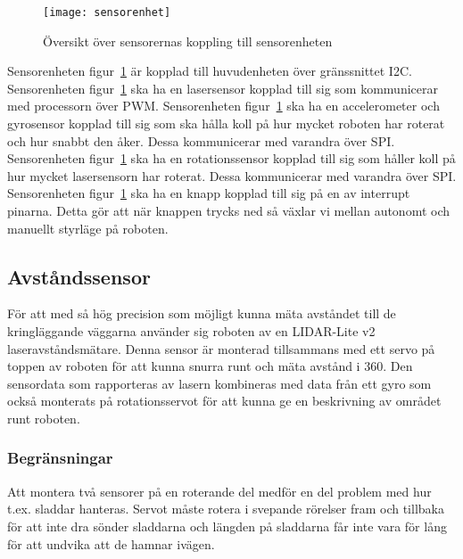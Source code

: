 \documentclass{article}
\begin{document}
\begin{figure}[H]
\centering
\texttt{[image: sensorenhet]}
\caption{Översikt över sensorernas koppling till sensorenheten}
\label{fig:sensorenhet}
\end{figure}
Sensorenheten figur~\ref{fig:sensorenhet} är kopplad till huvudenheten över gränssnittet I2C.\newline\newline
Sensorenheten figur~\ref{fig:sensorenhet} ska ha en lasersensor kopplad till sig som kommunicerar med processorn över PWM.\newline\newline
Sensorenheten figur~\ref{fig:sensorenhet} ska ha en accelerometer och gyrosensor kopplad till sig som ska hålla koll på hur mycket roboten har roterat och hur snabbt den åker. Dessa kommunicerar med varandra över SPI. \newline\newline
Sensorenheten figur~\ref{fig:sensorenhet} ska ha en rotationssensor kopplad till sig som håller koll på hur mycket lasersensorn har roterat. Dessa kommunicerar med varandra över SPI. \newline\newline
Sensorenheten figur~\ref{fig:sensorenhet} ska ha en knapp kopplad till sig på en av interrupt pinarna. Detta gör att när knappen trycks ned så växlar vi mellan autonomt och manuellt styrläge på roboten. \newline\newline

\subsection{Avståndssensor}
För att med så hög precision som möjligt kunna mäta avståndet till de kringläggande väggarna använder sig roboten av en LIDAR-Lite v2 laseravståndsmätare. Denna sensor är monterad tillsammans med ett servo på toppen av roboten för att kunna snurra runt och mäta avstånd i 360\textdegree. Den sensordata som rapporteras av lasern kombineras med data från ett gyro som också monterats på rotationsservot för att kunna ge en beskrivning av området runt roboten.

\subsubsection{Begränsningar}
Att montera två sensorer på en roterande del medför en del problem med hur t.ex. sladdar hanteras. Servot måste rotera i svepande rörelser fram och tillbaka för att inte dra sönder sladdarna och längden på sladdarna får inte vara för lång för att undvika att de hamnar ivägen.
\end{document}
